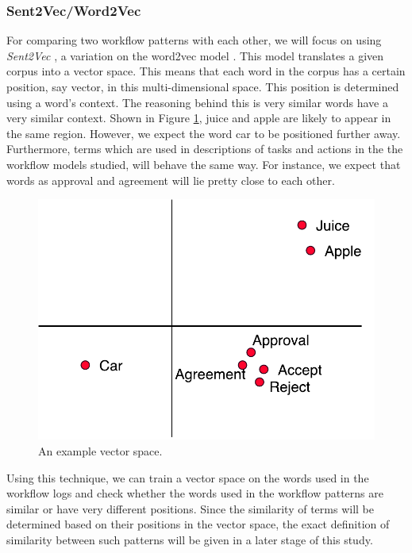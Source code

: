 \documentclass[a4paper,11pt]{article}
\begin{document}
\subsubsection{Sent2Vec/Word2Vec}
For comparing two workflow patterns with each other, we will focus on using \textit{Sent2Vec} \cite{Sent2Vec}, a variation on the word2vec model \cite{Mikolov2013a,Mikolov2013b}. This model translates a given corpus into a vector space. This means that each word in the corpus has a certain position, say vector, in this multi-dimensional space. This position is determined using a word's context. The reasoning behind this is very similar words have a very similar context. Shown in Figure \ref{figure:word2vec_example}, juice and apple are likely to appear in the same region. However, we expect the word car to be positioned further away. Furthermore, terms which are used in descriptions of tasks and actions in the the workflow models studied, will behave the same way. For instance, we expect that words as approval and agreement will lie pretty close to each other. 

\begin{figure}[H]
\centering
\includegraphics[width=0.7\linewidth]{word2vec_example.pdf}
\caption{An example vector space.}
\label{figure:word2vec_example}
\end{figure}


Using this technique, we can train a vector space on the words used in the workflow logs and check whether the words used in the workflow patterns are similar or have very different positions. Since the similarity of terms will be determined based on their positions in the vector space, the exact definition of similarity between such patterns will be given in a later stage of this study. 
\end{document}
